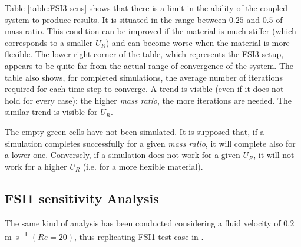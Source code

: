 Table \ref{table:FSI3-sens} shows that there is a limit in the ability of the coupled system to produce results. It is situated in the range between $0.25$ and $0.5$ of mass ratio. This condition can be improved if the material is much stiffer (which corresponds to a smaller $U_R$) and can become worse when the material is more flexible. The lower right corner of the table, which represents the FSI3 setup, appears to be quite far from the actual range of convergence of the system. The table also shows, for completed simulations, the average number of iterations required for each time step to converge. A trend is visible (even if it does not hold for every case): the higher \textit{mass ratio}, the more iterations are needed. The similar trend is visible for $U_R$.

The empty green cells have not been simulated. It is supposed that, if a simulation completes successfully for a given \textit{mass ratio}, it will complete also for a lower one. Conversely, if a simulation does not work for a given $U_R$, it will not work for a higher $U_R$ (i.e. for a more flexible material).   


\subsection{FSI1 sensitivity Analysis}

The same kind of analysis has been conducted considering a fluid velocity of $0.2$\si{m.s^{-1}} $(Re=20)$, thus replicating FSI1 test case in \cite{turek2006proposal}.  

